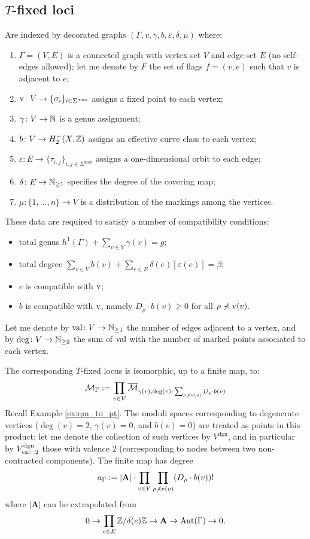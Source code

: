 \subsection{$T$-fixed loci} Are indexed by decorated graphs
$\left(\Gamma, v, \gamma, b,\varepsilon,\delta,\mu\right)$
where:
\begin{enumerate}
 \item $\Gamma=(V,E)$ is a connected graph with vertex set $V$ and edge set $E$ (no self-edges allowed); let me denote by $F$ the set of flags $f=(v,e)$ such that $v$ is adjacent to $e$;
 \item $\operatorname{v}\colon V\rightarrow \{\sigma_i\}_{i\in\Sigma^\text{max}}$ assigns a fixed point to each vertex;
 \item $\gamma\colon V\rightarrow \mathbb{N}$ is a genus assignment;
 \item $b\colon V\rightarrow H^+_2(X,\mathbb{Z})$ assigns an effective curve class to each vertex;
 \item $\varepsilon\colon E\to \{\tau_{i,j}\}_{i,j\in\Sigma^\text{max}}$ assigns a one-dimensional orbit to each edge;
 \item $\delta\colon E\rightarrow \mathbb{N}_{\geq1}$ specifies the degree of the covering map;
 \item $\mu\colon \{1,\ldots,n\}\to V$ is a distribution of the markings among the vertices.
\end{enumerate}
These data are required to satisfy a number of compatibility conditions:
\begin{itemize}
 \item total genus $h^1(\Gamma)+\sum_{v\in V} \gamma(v)=g$;
 \item total degree $\sum_{v\in V}b(v)+\sum_{e\in E}\delta(e)[\varepsilon(e)]=\beta$;
 \item $e$ is compatible with $\operatorname{v}$;
 \item $b$ is compatible with $\operatorname{v}$, namely $D_\rho\cdot b(v) \geq 0$ for all $\rho\nprec \operatorname{v}(v)$.

 \end{itemize}
Let me denote by $\operatorname{val}\colon V\rightarrow\mathbb{N}_{\geq1}$ the number of edges adjacent to a vertex, and by $\deg\colon V\rightarrow\mathbb{N}_{\geq2}$ the sum of $\operatorname{val}$ with the number of marked points associated to each vertex.

The corresponding $T$-fixed locus is isomorphic, up to a finite map, to:
\[
 \mathcal M_\Gamma:= \prod_{v\in V} \overline{\mathcal M}_{\gamma(v),\deg(v)|\sum_{\rho\nprec \operatorname{v}(v)}D_\rho\cdot b(v)}
\]
Recall Example \ref{ex:qm_to_pt}. The moduli spaces corresponding to degenerate vertices ($\deg(v)=2$, $\gamma(v)=0$, and $b(v)=0$) are treated as points in this product; let me denote the collection of such vertices by $V^{\text{dgn}}$, and in particular by $V^{\text{dgn}}_{\operatorname{val}=2}$ those with valence $2$ (corresponding to nodes between two non-contracted components). The finite map has degree \[a_\Gamma:=|\mathbf A|\cdot\prod_{v\in V}\prod_{\rho\nprec\operatorname{v}(v)}(D_\rho\cdot b(v))!\] where $|\mathbf A|$ can be extrapolated from
\[
 0\rightarrow\prod_{e\in E}\mathbb{Z}/\delta(e)\mathbb{Z}\rightarrow \mathbf A\rightarrow \operatorname{Aut}(\Gamma)\rightarrow 0.
\]

